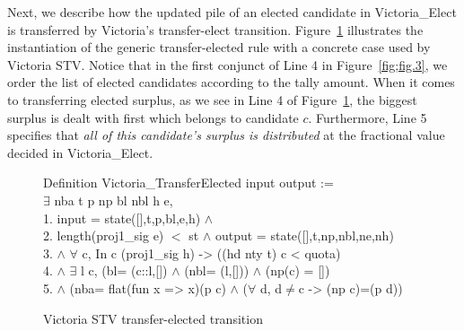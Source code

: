 \documentclass{llncs}
\begin{document}
Next, we describe how the updated pile of an elected candidate in {\selectfont Victoria\_Elect} is transferred by Victoria's transfer-elect transition.       
Figure~\ref{fig;fig.4} illustrates the instantiation of the generic
transfer-elected rule with a concrete case used by Victoria STV.
Notice that in the first conjunct of Line 4 in
Figure~\ref{fig;fig.3}, we order the list of elected candidates
according to the tally amount. When it comes to transferring elected
surplus, as we see in Line 4 of Figure~\ref{fig;fig.4}, the biggest
surplus is dealt with first which belongs to candidate $c$.
Furthermore, Line 5 specifies that  \emph{all of this candidate's
surplus is distributed} at the fractional value decided in
{\selectfont Victoria\_Elect}.
\begin{scriptsize}
\begin{figure}[h]
{\selectfont
 Definition Victoria\_TransferElected \textsf{input} \textsf{output} :=\\ $\exists$ nba t p np bl nbl h e, \\
     1. \textsf{input} = \textsf{state}([],t,p,bl,e,h) $\wedge$\\
     2. \textsf{length}(proj1\_sig e) $<$ st $\wedge$
     \textsf{output} = \textsf{state}([],t,np,nbl,ne,nh)\\
     3. $\wedge$ $\forall$ c, In c (proj1\_sig h) -> ((\textsf{hd} nty t) c < quota)\\
 4. $\wedge$ $\exists$ l c, (bl= (c::l,[]) $\wedge$ (nbl= (l,[])) $\wedge$ (np(c) = []) \\
 5. $\wedge$ (nba= \textsf{flat}(fun x => x)(p c) $\wedge$ ($\forall$ d, d$\neq$c -> (np c)=(p d))\\  
}
\caption{Victoria STV transfer-elected transition}
\label{fig;fig.4}
\end{figure}
\end{scriptsize}
\end{document}
